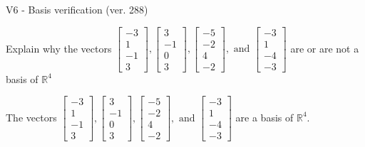 \begin{exercise}
  \begin{exerciseTitle}V6 - Basis verification (ver. 288)\end{exerciseTitle}
  \begin{exerciseStatement}
    Explain why the vectors \(\left[\begin{array}{r}
-3 \\
1 \\
-1 \\
3
\end{array}\right] , \left[\begin{array}{r}
3 \\
-1 \\
0 \\
3
\end{array}\right] , \left[\begin{array}{r}
-5 \\
-2 \\
4 \\
-2
\end{array}\right] , \text{ and } \left[\begin{array}{r}
-3 \\
1 \\
-4 \\
-3
\end{array}\right]\) are or are not a basis of \(\mathbb{R}^4\)	


  \end{exerciseStatement}
  \begin{exerciseAnswer}
   The vectors \(\left[\begin{array}{r}
-3 \\
1 \\
-1 \\
3
\end{array}\right] , \left[\begin{array}{r}
3 \\
-1 \\
0 \\
3
\end{array}\right] , \left[\begin{array}{r}
-5 \\
-2 \\
4 \\
-2
\end{array}\right] , \text{ and } \left[\begin{array}{r}
-3 \\
1 \\
-4 \\
-3
\end{array}\right]\) 
  	 are  a basis of \(\mathbb{R}^4\).
  


  \end{exerciseAnswer}
\end{exercise}